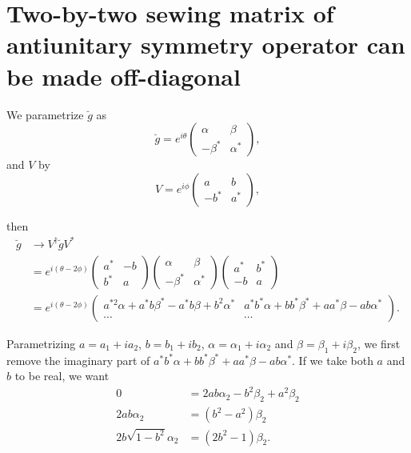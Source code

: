 \documentclass[aps, prb, showpacs, twocolumn, notitlepage, superscriptaddress]{revtex4-1}
\begin{document}
\section{Two-by-two sewing matrix of antiunitary symmetry operator can be made off-diagonal}

We parametrize $\breve{g}$ as
\begin{equation}
\breve{g}=e^{i\theta}\left(\begin{array}{cc}
\alpha & \beta\\
-\beta^{*} & \alpha^{*}
\end{array}\right),
\end{equation}
and $V$ by
\begin{equation}
V=e^{i\phi}\left(\begin{array}{cc}
a & b\\
-b^{*} & a^{*}
\end{array}\right),
\end{equation}
\begin{widetext}
then 
\begin{align}
\breve{g} & \to V^{\dagger}\breve{g}V^{*}\\
 & =e^{i(\theta-2\phi)}\left(\begin{array}{cc}
a^{*} & -b\\
b^{*} & a
\end{array}\right)\left(\begin{array}{cc}
\alpha & \beta\\
-\beta^{*} & \alpha^{*}
\end{array}\right)\left(\begin{array}{cc}
a^{*} & b^{*}\\
-b & a
\end{array}\right)\\
 & =e^{i(\theta-2\phi)}\left(\begin{array}{cc}
a^{*2}\alpha+a^{*}b\beta^{*}-a^{*}b\beta+b^{2}\alpha^{*} & a^{*}b^{*}\alpha+bb^{*}\beta^{*}+aa^{*}\beta-ab\alpha^{*}\\
\cdots & \cdots
\end{array}\right).
\end{align}
\end{widetext}
Parametrizing $a=a_{1}+ia_{2}$, $b=b_{1}+ib_{2}$, $\alpha=\alpha_{1}+i\alpha_{2}$
and $\beta=\beta_{1}+i\beta_{2}$, we first remove the imaginary part
of $a^{*}b^{*}\alpha+bb^{*}\beta^{*}+aa^{*}\beta-ab\alpha^{*}$. If
we take both $a$ and $b$ to be real, we want
\begin{align*}
0 & =2ab\alpha_{2}-b^{2}\beta_{2}+a^{2}\beta_{2}\\
2ab\alpha_{2} & =(b^{2}-a^{2})\beta_{2}\\
2b\sqrt{1-b^{2}}\alpha_{2} & =(2b^{2}-1)\beta_{2}.
\end{align*}
\end{document}
